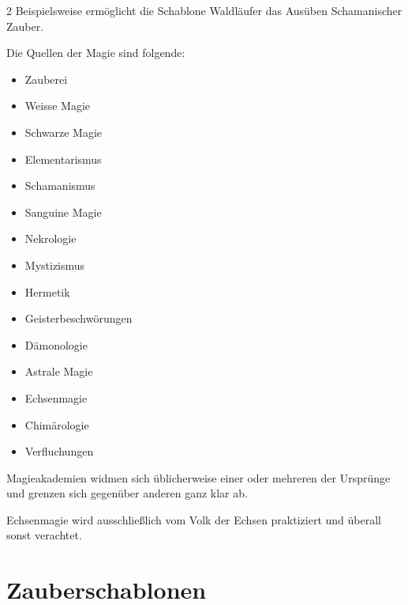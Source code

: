 \begin{multicols}{2}
Beispielsweise ermöglicht die Schablone Waldläufer das Ausüben Schamanischer Zauber.

Die Quellen der Magie sind folgende:
\begin{itemize}
    \item Zauberei
    \item Weisse Magie
    \item Schwarze Magie
    \item Elementarismus
    \item Schamanismus
    \item Sanguine Magie
    \item Nekrologie
    \item Mystizismus
    \item Hermetik
    \item Geisterbeschwörungen
    \item Dämonologie
    \item Astrale Magie
    \item Echsenmagie
    \item Chimärologie
    \item Verfluchungen
\end{itemize}

Magieakademien widmen sich üblicherweise einer oder mehreren der Ursprünge und grenzen sich gegenüber anderen ganz klar ab.

Echsenmagie wird ausschließlich vom Volk der Echsen praktiziert und überall sonst verachtet.

\section{Zauberschablonen}


\end{multicols}
